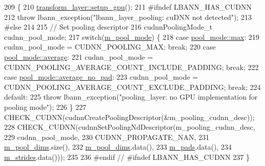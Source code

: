 \begin{DoxyCode}
209                             \{
210     \hyperlink{classlbann_1_1Layer_a36aa22ef90ce4de65abe729d38490863}{transform\_layer::setup\_gpu}();
211 \textcolor{preprocessor}{  #ifndef LBANN\_HAS\_CUDNN}
212     \textcolor{keywordflow}{throw} lbann\_exception(\textcolor{stringliteral}{"lbann\_layer\_pooling: cuDNN not detected"});
213 \textcolor{preprocessor}{  #else}
214 
215     \textcolor{comment}{// Set pooling descriptor}
216     cudnnPoolingMode\_t cudnn\_pool\_mode;
217     \textcolor{keywordflow}{switch}(\hyperlink{classlbann_1_1pooling__layer_a7b19407c88f89757e64ed3d4afab8443}{m\_pool\_mode}) \{
218     \textcolor{keywordflow}{case} \hyperlink{base_8hpp_ac47a6ee5278a53898222a48639a2bf39a2ffe4e77325d9a7152f7086ea7aa5114}{pool\_mode::max}:
219       cudnn\_pool\_mode = CUDNN\_POOLING\_MAX; \textcolor{keywordflow}{break};
220     \textcolor{keywordflow}{case} \hyperlink{base_8hpp_ac47a6ee5278a53898222a48639a2bf39a6927a3a7218a3195858411433ec20a21}{pool\_mode::average}:
221       cudnn\_pool\_mode = CUDNN\_POOLING\_AVERAGE\_COUNT\_INCLUDE\_PADDING; \textcolor{keywordflow}{break};
222     \textcolor{keywordflow}{case} \hyperlink{base_8hpp_ac47a6ee5278a53898222a48639a2bf39ad91c68878ae16f6dfcd4e1551c33cdd1}{pool\_mode::average\_no\_pad}:
223       cudnn\_pool\_mode = CUDNN\_POOLING\_AVERAGE\_COUNT\_EXCLUDE\_PADDING; \textcolor{keywordflow}{break};
224     \textcolor{keywordflow}{default}:
225       \textcolor{keywordflow}{throw} lbann\_exception(\textcolor{stringliteral}{"pooling\_layer: no GPU implementation for pooling mode"});
226     \}
227     CHECK\_CUDNN(cudnnCreatePoolingDescriptor(&m\_pooling\_cudnn\_desc));
228     CHECK\_CUDNN(cudnnSetPoolingNdDescriptor(m\_pooling\_cudnn\_desc,
229                                             cudnn\_pool\_mode,
230                                             CUDNN\_PROPAGATE\_NAN,
231                                             \hyperlink{classlbann_1_1pooling__layer_abb52fe974f602921823a46320fd7d075}{m\_pool\_dims}.size(),
232                                             \hyperlink{classlbann_1_1pooling__layer_abb52fe974f602921823a46320fd7d075}{m\_pool\_dims}.data(),
233                                             \hyperlink{classlbann_1_1pooling__layer_a22fd39aa4358149110a369ddf0e5ffdb}{m\_pads}.data(),
234                                             \hyperlink{classlbann_1_1pooling__layer_a754bb6d49b39e915f315ca0049c953d9}{m\_strides}.data()));
235 
236 \textcolor{preprocessor}{  #endif // #ifndef LBANN\_HAS\_CUDNN}
237   \}
\end{DoxyCode}
